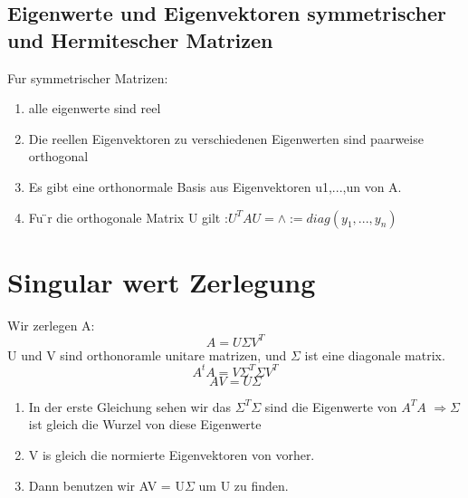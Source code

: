\documentclass[11pt]{article}
\begin{document}
\subsection{Eigenwerte und Eigenvektoren symmetrischer und Hermitescher Matrizen}
Fur symmetrischer Matrizen:
\begin{enumerate}
	\item alle eigenwerte sind reel
	\item Die reellen Eigenvektoren zu verschiedenen Eigenwerten sind paarweise orthogonal
	\item Es gibt eine orthonormale Basis aus Eigenvektoren u1,...,un von A.
	\item Fu ̈r die orthogonale Matrix U gilt :$U^TAU= \wedge:= diag(y_1,...,y_n)$
\end{enumerate}
\section{Singular wert Zerlegung}
Wir zerlegen A:
\begin{equation}
	A = U\Sigma V^T
\end{equation}
U und V sind orthonoramle unitare matrizen, und $\Sigma$ ist eine diagonale matrix.
\begin{equation}
	A^tA=V\Sigma^T\Sigma V^T
\end{equation}
\begin{equation}
	AV=U\Sigma
\end{equation}
\begin{enumerate}
	\item In der erste Gleichung sehen wir das $\Sigma^T\Sigma$ sind die Eigenwerte von $A^TA$ $\Rightarrow \Sigma$ ist gleich die Wurzel von diese Eigenwerte
	\item V is gleich die normierte Eigenvektoren von vorher.
	\item Dann benutzen wir AV = U$\Sigma$ um U zu finden.
\end{enumerate}
\end{document}
